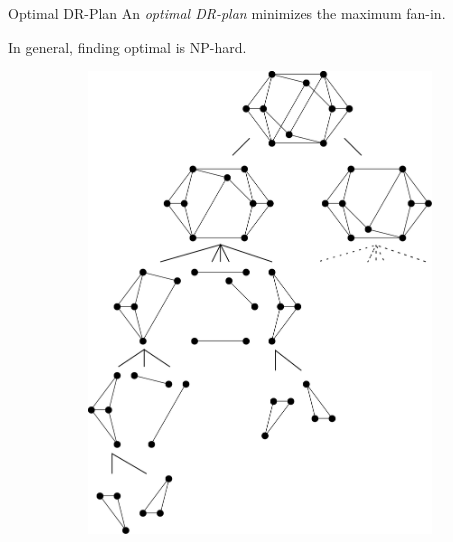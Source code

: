\documentclass{mySlides}
\newcommand{\n}{\vspace{1em}}
\begin{document}
\begin{frame}{Optimal DR-Plan}
    An \emph{optimal DR-plan} minimizes the maximum fan-in.

    \pause
    \n

    In general, finding optimal is NP-hard.


    \begin{figure}\centering
        \begin{subfigure}{.35\linewidth}\centering
            \includegraphics[width=\linewidth]{../../img/svg/new_overconstrained_optimal}
        \end{subfigure}

\end{figure}
\end{frame}
\end{document}
